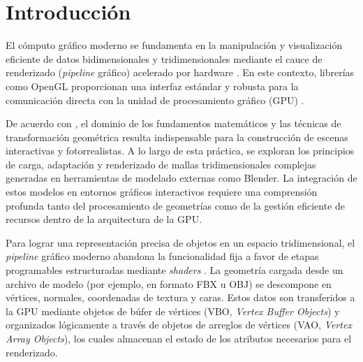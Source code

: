 
\section{Introducción}

El cómputo gráfico moderno se fundamenta en la manipulación y visualización eficiente de datos bidimensionales y tridimensionales mediante el cauce de renderizado (\textit{pipeline} gráfico) acelerado por hardware \cite{hearn_baker}. En este contexto, librerías como OpenGL proporcionan una interfaz estándar y robusta para la comunicación directa con la unidad de procesamiento gráfico (GPU) \cite{khronos_opengl}.

De acuerdo con \cite{teodoro_vite}, el dominio de los fundamentos matemáticos y las técnicas de transformación geométrica resulta indispensable para la construcción de escenas interactivas y fotorrealistas. A lo largo de esta práctica, se exploran los principios de carga, adaptación y renderizado de mallas tridimensionales complejas generadas en herramientas de modelado externas como Blender. La integración de estos modelos en entornos gráficos interactivos requiere una comprensión profunda tanto del procesamiento de geometrías como de la gestión eficiente de recursos dentro de la arquitectura de la GPU.

Para lograr una representación precisa de objetos en un espacio tridimensional, el \textit{pipeline} gráfico moderno abandona la funcionalidad fija a favor de etapas programables estructuradas mediante \textit{shaders} \cite{shreiner_opengl}. La geometría cargada desde un archivo de modelo (por ejemplo, en formato FBX u OBJ) se descompone en vértices, normales, coordenadas de textura y caras. Estos datos son transferidos a la GPU mediante objetos de búfer de vértices (VBO, \textit{Vertex Buffer Objects}) y organizados lógicamente a través de objetos de arreglos de vértices (VAO, \textit{Vertex Array Objects}), los cuales almacenan el estado de los atributos necesarios para el renderizado.

